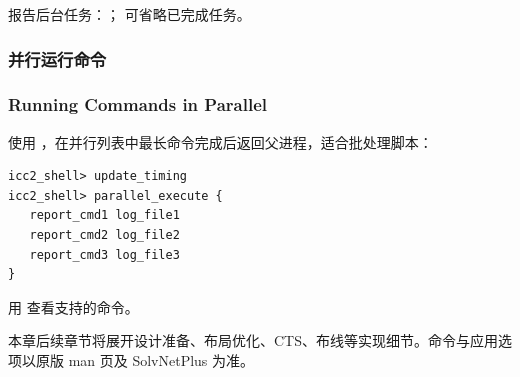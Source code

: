 报告后台任务：； 可省略已完成任务。

\subsubsection{并行运行命令}
\subsubsection*{Running Commands in Parallel}

使用 ，在并行列表中最长命令完成后返回父进程，适合批处理脚本：
\begin{lstlisting}
icc2_shell> update_timing
icc2_shell> parallel_execute {
   report_cmd1 log_file1
   report_cmd2 log_file2
   report_cmd3 log_file3
}
\end{lstlisting}

用  查看支持的命令。

\begin{seeAlsoBox}
本章后续章节将展开设计准备、布局优化、CTS、布线等实现细节。命令与应用选项以原版 man 页及 SolvNetPlus 为准。
\end{seeAlsoBox}

